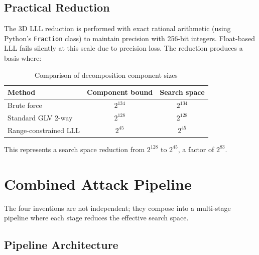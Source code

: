 \documentclass[11pt,a4paper]{article}
\theoremstyle{definition}
\newcommand{\Zomega}{\mathbb{Z}[\omega]}
\begin{document}
\subsection{Practical Reduction}

The 3D LLL reduction is performed with exact rational arithmetic (using Python's \texttt{Fraction} class) to maintain precision with 256-bit integers. Float-based LLL fails silently at this scale due to precision loss. The reduction produces a basis where:

\begin{table}[htbp]
\centering
\caption{Comparison of decomposition component sizes}
\label{tab:decomp}
\begin{tabular}{lcc}
\toprule
Method & Component bound & Search space \\
\midrule
Brute force & $2^{134}$ & $2^{134}$ \\
Standard GLV 2-way & $2^{128}$ & $2^{128}$ \\
Range-constrained LLL & $2^{45}$ & $2^{45}$ \\
\bottomrule
\end{tabular}
\end{table}

This represents a search space reduction from $2^{128}$ to $2^{45}$, a factor of $2^{83}$.


\section{Combined Attack Pipeline}\label{sec:pipeline}

The four inventions are not independent; they compose into a multi-stage pipeline where each stage reduces the effective search space.

\subsection{Pipeline Architecture}

\begin{center}
\end{center}
\end{document}
